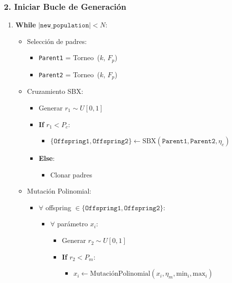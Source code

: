 \subsubsection*{2. Iniciar Bucle de Generación}
\begin{enumerate}[label= (\alph*)]
    \item \textbf{While} $|\texttt{new\_population}| < N$:
    \begin{itemize}
        \item Selección de padres:
        \begin{itemize}
            \item \texttt{Parent1} = Torneo~($k$, $F_p$)
            \item \texttt{Parent2} = Torneo~($k$, $F_p$)
        \end{itemize}

        \item Cruzamiento SBX:\
        \begin{itemize}
            \item Generar $r_1 \sim U[0,1]$
            \item \textbf{If} $r_1 < P_c$:
            \begin{itemize}
                \item $\{\texttt{Offspring1}, \texttt{Offspring2}\} \leftarrow \text{SBX}(\texttt{Parent1}, \texttt{Parent2}, \eta_c)$
            \end{itemize}
            \item \textbf{Else}:
            \begin{itemize}
                \item Clonar padres
            \end{itemize}
        \end{itemize}

        \item Mutación Polinomial:
        \begin{itemize}
            \item $\forall$ offspring $\in \{\texttt{Offspring1}, \texttt{Offspring2}\}$:
            \begin{itemize}
                \item $\forall$ parámetro $x_i$:
                \begin{itemize}
                    \item Generar $r_2 \sim U[0,1]$
                    \item \textbf{If} $r_2 < P_m$:
                    \begin{itemize}
                        \item $x_i \leftarrow \text{MutaciónPolinomial}(x_i, \eta_m, \text{min}_i, \text{max}_i)$
                    \end{itemize}
                \end{itemize}
            \end{itemize}
        \end{itemize}


\end{itemize}
\end{enumerate}
